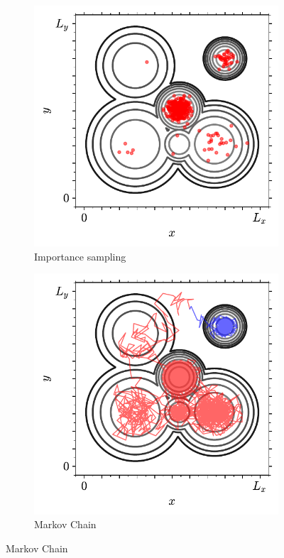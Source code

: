 \begin{figure}[btp]
     \vspace{2mm}
     \begin{subfigure}[b]{0.45\textwidth}
         \centering
         \includegraphics[width=\textwidth]{./figures/methods/mc_2d_imp.pdf}
         \caption{Importance sampling}
         \label{fig:montecarloint3}
     \end{subfigure}
     \hfill
     \begin{subfigure}[b]{0.45\textwidth}
         \centering
         \includegraphics[width=\textwidth]{./figures/methods/mc_2d_mcmc.pdf}
         \caption{Markov Chain \mc}
         \label{fig:montecarloint4}
     \end{subfigure}
     \hfill
    

\end{figure}
